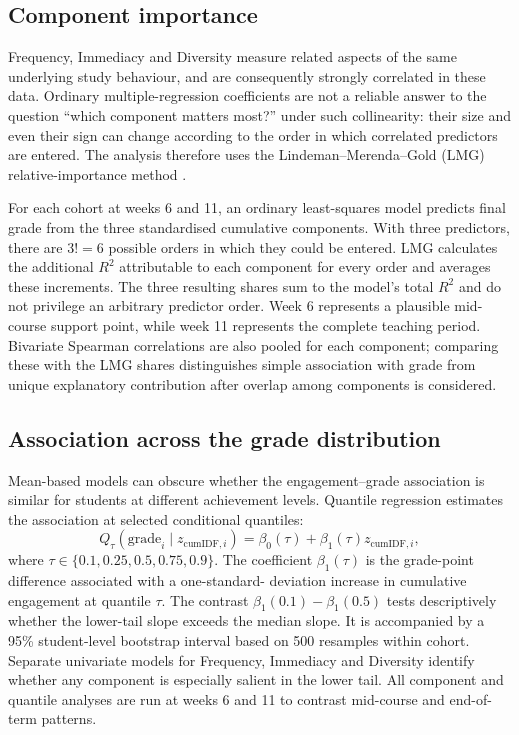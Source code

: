 \documentclass[11pt,a4paper]{article}
\begin{document}
\subsection{Component importance}
Frequency, Immediacy and Diversity measure related aspects of the same underlying
study behaviour, and are consequently strongly correlated in these data. Ordinary
multiple-regression coefficients are not a reliable answer to the question
``which component matters most?'' under such collinearity: their size and even
their sign can change according to the order in which correlated predictors are
entered. The analysis therefore uses the Lindeman--Merenda--Gold (LMG)
relative-importance method \citep{lindeman1980}.

For each cohort at weeks 6 and 11, an ordinary least-squares model predicts final
grade from the three standardised cumulative components. With three predictors,
there are $3! = 6$ possible orders in which they could be entered. LMG calculates
the additional $R^2$ attributable to each component for every order and averages
these increments. The three resulting shares sum to the model's total $R^2$ and
do not privilege an arbitrary predictor order. Week 6 represents a plausible
mid-course support point, while week 11 represents the complete teaching period.
Bivariate Spearman correlations are also pooled for each component; comparing
these with the LMG shares distinguishes simple association with grade from unique
explanatory contribution after overlap among components is considered.

\subsection{Association across the grade distribution}
Mean-based models can obscure whether the engagement--grade association is
similar for students at different achievement levels. Quantile regression
\citep{koenker1978} estimates the association at selected conditional quantiles:
\[
  Q_{\tau}(\mathrm{grade}_i \mid z_{\mathrm{cumIDF},i}) =
  \beta_0(\tau) + \beta_1(\tau)z_{\mathrm{cumIDF},i},
\]
where $\tau \in \{0.1, 0.25, 0.5, 0.75, 0.9\}$. The coefficient
$\beta_1(\tau)$ is the grade-point difference associated with a one-standard-
deviation increase in cumulative engagement at quantile $\tau$. The contrast
$\beta_1(0.1)-\beta_1(0.5)$ tests descriptively whether the lower-tail slope
exceeds the median slope. It is accompanied by a 95\% student-level bootstrap
interval based on 500 resamples within cohort. Separate univariate models for
Frequency, Immediacy and Diversity identify whether any component is especially
salient in the lower tail. All component and quantile analyses are run at weeks
6 and 11 to contrast mid-course and end-of-term patterns.
\end{document}
